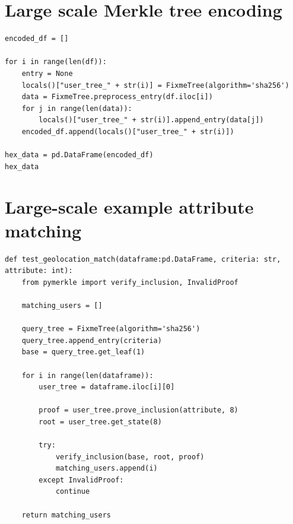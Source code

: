 \documentclass[english, 12pt, a4paper, sci, utf8, a-2b, online]{aaltothesis}
\theoremstyle{change}
\theoremstyle{theoremstyle}
\begin{document}
\section{Large scale Merkle tree encoding}\label{code:large_examp}
\begin{verbatim}
encoded_df = []

for i in range(len(df)):
    entry = None
    locals()["user_tree_" + str(i)] = FixmeTree(algorithm='sha256')
    data = FixmeTree.preprocess_entry(df.iloc[i])
    for j in range(len(data)):
        locals()["user_tree_" + str(i)].append_entry(data[j])
    encoded_df.append(locals()["user_tree_" + str(i)])

hex_data = pd.DataFrame(encoded_df)
hex_data
\end{verbatim}
\section{Large-scale example attribute matching}\label{code:large_verif}
\begin{verbatim}
def test_geolocation_match(dataframe:pd.DataFrame, criteria: str, attribute: int):
    from pymerkle import verify_inclusion, InvalidProof
    
    matching_users = []

    query_tree = FixmeTree(algorithm='sha256')
    query_tree.append_entry(criteria)
    base = query_tree.get_leaf(1)

    for i in range(len(dataframe)):
        user_tree = dataframe.iloc[i][0]

        proof = user_tree.prove_inclusion(attribute, 8)
        root = user_tree.get_state(8)

        try:
            verify_inclusion(base, root, proof)
            matching_users.append(i)
        except InvalidProof:
            continue

    return matching_users
\end{verbatim}
\end{document}
